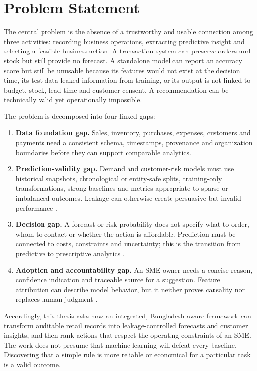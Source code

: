 \section{Problem Statement}

The central problem is the absence of a trustworthy and usable connection among
three activities: recording business operations, extracting predictive insight and
selecting a feasible business action. A transaction system can preserve orders
and stock but still provide no forecast. A standalone model can report an
accuracy score but still be unusable because its features would not exist at the
decision time, its test data leaked information from training, or its output is
not linked to budget, stock, lead time and customer consent. A recommendation
can be technically valid yet operationally impossible.

The problem is decomposed into four linked gaps:

\begin{enumerate}[label=G\arabic*.]
  \item \textbf{Data foundation gap.} Sales, inventory, purchases, expenses,
  customers and payments need a consistent schema, timestamps, provenance and
  organization boundaries before they can support comparable analytics.
  \item \textbf{Prediction-validity gap.} Demand and customer-risk models must
  use historical snapshots, chronological or entity-safe splits, training-only
  transformations, strong baselines and metrics appropriate to sparse or
  imbalanced outcomes. Leakage can otherwise create persuasive but invalid
  performance \cite{kaufman2012leakage}.
  \item \textbf{Decision gap.} A forecast or risk probability does not specify
  what to order, whom to contact or whether the action is affordable. Prediction
  must be connected to costs, constraints and uncertainty; this is the
  transition from predictive to prescriptive analytics
  \cite{bertsimas2020prescriptive}.
  \item \textbf{Adoption and accountability gap.} An SME owner needs a concise
  reason, confidence indication and traceable source for a suggestion. Feature
  attribution can describe model behavior, but it neither proves causality nor
  replaces human judgment \cite{lundberg2017shap,miller2019explanation}.
\end{enumerate}

Accordingly, this thesis asks how an integrated, Bangladesh-aware framework can
transform auditable retail records into leakage-controlled forecasts and
customer insights, and then rank actions that respect the operating constraints
of an SME. The work does not presume that machine learning will defeat every
baseline. Discovering that a simple rule is more reliable or economical for a
particular task is a valid outcome.

